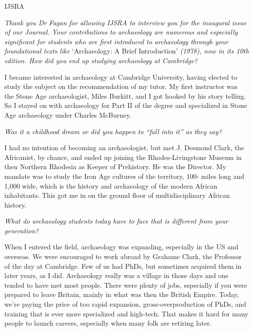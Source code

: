 \begin{labeling}{IJSRA}	
\item[IJSRA (International Journal of Student Research in Archaeology)] \textit{Thank you Dr Fagan for allowing IJSRA to interview you for the inaugural issue of our Journal. Your contributions to archaeology are numerous and especially significant for students who are first introduced to archaeology through your foundational texts like} ‘Archaeology: A Brief Introduction’ \textit{(1978), now in its 10th edition. \newline
How did you end up studying archaeology at Cambridge?}
	
\item[BMF (Dr. Brian M Fagan)] I became interested in archaeology at Cambridge University, having elected to study the subject on the recommendation of my tutor. My first instructor was the Stone Age archaeologist, Miles Burkitt, and I got hooked by his story telling. So I stayed on with archaeology for Part II of the degree and specialized in Stone Age archaeology under Charles McBurney.

\item[IJSRA]\textit{Was it a childhood dream or did you happen to “fall into it” as they say?}

\item[BMF] I had no intention of becoming an archaeologist, but met J. Desmond Clark, the Africanist, by chance, and ended up joining the Rhodes-Livingstone Museum in then Northern Rhodesia as Keeper of Prehistory. He was the Director. My mandate was to study the Iron Age cultures of the territory, 100- miles long and 1,000 wide, which is the history and archaeology of the modern African inhabitants. This got me in on the ground floor of multidisciplinary African history.

\item[IJSRA]\textit{What do archaeology students today have to face that is different from your generation?}

\item[BMF] When I entered the field, archaeology was expanding, especially in the US and overseas. We were encouraged to work abroad by Grahame Clark, the Professor of the day at Cambridge. Few of us had PhDs, but sometimes acquired them in later years, as I did. Archaeology really was a village in those days and one tended to have met most people. There were plenty of jobs, especially if you were prepared to leave Britain, mainly in what was then the British Empire. Today, we’re paying the price of too rapid expansion, gross-overproduction of PhDs, and training that is ever more specialized and high-tech. That makes it hard for many people to launch careers, especially when many folk are retiring later.
	

\end{labeling}
